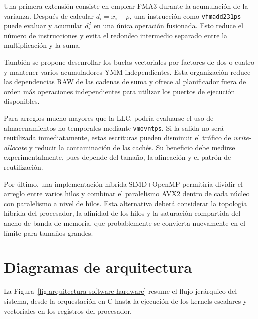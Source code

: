 \documentclass[journal]{IEEEtran}
\begin{document}
Una primera extensión consiste en emplear FMA3 durante la acumulación de la
varianza. Después de calcular $d_i=x_i-\mu$, una instrucción como
\texttt{vfmadd231ps} puede evaluar y acumular $d_i^2$ en una única operación
fusionada. Esto reduce el número de instrucciones y evita el redondeo intermedio
separado entre la multiplicación y la suma.

También se propone desenrollar los bucles vectoriales por factores de dos o
cuatro y mantener varios acumuladores YMM independientes. Esta organización
reduce las dependencias RAW de las cadenas de suma y ofrece al planificador
fuera de orden más operaciones independientes para utilizar los puertos de
ejecución disponibles.

Para arreglos mucho mayores que la LLC, podría evaluarse el uso de
almacenamientos no temporales mediante \texttt{vmovntps}. Si la salida no será
reutilizada inmediatamente, estas escrituras pueden disminuir el tráfico de
\textit{write-allocate} y reducir la contaminación de las cachés. Su beneficio
debe medirse experimentalmente, pues depende del tamaño, la alineación y el
patrón de reutilización.

Por último, una implementación híbrida SIMD+OpenMP permitiría dividir el arreglo
entre varios hilos y combinar el paralelismo AVX2 dentro de cada núcleo con
paralelismo a nivel de hilos. Esta alternativa deberá considerar la topología
híbrida del procesador, la afinidad de los hilos y la saturación compartida del
ancho de banda de memoria, que probablemente se convierta nuevamente en el
límite para tamaños grandes.

\clearpage
\appendices
\onecolumn
\section{Diagramas de arquitectura}

La Figura~\ref{fig:arquitectura-software-hardware} resume el flujo jerárquico
del sistema, desde la orquestación en C hasta la ejecución de los kernels
escalares y vectoriales en los registros del procesador.
\end{document}
